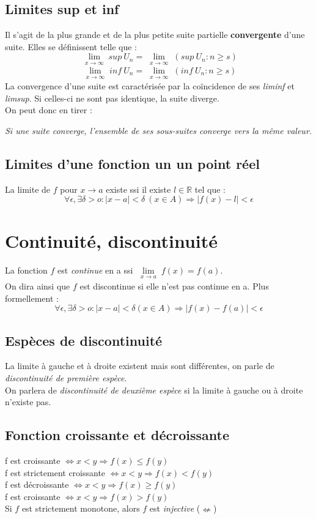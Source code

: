 \documentclass[british,french,11pt, a4paper, openany]{book}
\begin{document}
\subsection{Limites sup et inf}
Il s'agit de la plus grande et de la plus petite suite partielle \textbf{convergente} d'une suite. Elles se définissent telle que :
$$ \lim\limits_{\substack{x \to \infty}} sup\ U_{n} = \lim\limits_{\substack{x \to \infty}} (sup\ {U_{n} : n \geq s})$$
$$ \lim\limits_{\substack{x \to \infty}} inf\ U_{n} = \lim\limits_{\substack{x \to \infty}} (inf\ {U_{n} : n \geq s})$$
La convergence d'une suite est caractérisée par la coïncidence de ses \textit{liminf} et \textit{limsup}. Si celles-ci ne sont pas identique, la suite diverge.\\
On peut donc en tirer :\\
\begin{center}
	\textit{Si une suite converge, l'ensemble de ses sous-suites converge vers la même valeur.}
\end{center}

\subsection{Limites d'une fonction un un point réel}
La limite de $f$ pour $x \rightarrow a$ existe ssi il existe $l \in \mathbb{R}$ tel que : 
$$\forall \epsilon, \exists \delta > o : |x-a| < \delta\ (x \in A) \Rightarrow |f(x) - l| < \epsilon$$

\section{Continuité, discontinuité}
La fonction $f$ est \textit{continue} en a ssi $\lim\limits_{\substack{x \to a}} f(x) = f(a)$. \\
On dira ainsi que $f$ est discontinue si elle n'est pas continue en a. Plus formellement : 
$$\forall \epsilon, \exists \delta > o : |x-a| < \delta (x \in A) \Rightarrow |f(x) - f(a)| < \epsilon$$

\subsection{Espèces de discontinuité}
La limite à gauche et à droite existent mais sont différentes, on parle de \textit{discontinuité de première espèce}.\\
On parlera de \textit{discontinuité de deuxième espèce} si la limite à gauche ou à droite n'existe pas.

\subsection{Fonction croissante et décroissante}
f est croissante $\Leftrightarrow x < y \Rightarrow f(x) \leq f(y)$\\
f est strictement croissante $\Leftrightarrow x < y \Rightarrow f(x) < f(y)$\\
f est décroissante $\Leftrightarrow x < y \Rightarrow f(x) \geq f(y)$\\
f est croissante $\Leftrightarrow x < y \Rightarrow f(x) > f(y)$\\
Si $f$ est strictement monotone, alors $f$ est \textit{injective} ($\nLeftarrow$)
\end{document}
